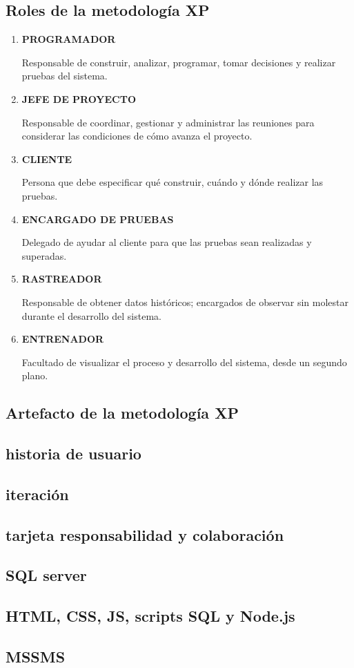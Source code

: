 \documentclass[12pt,a4paper]{article}
\newcommand{\newsubsection}[1]{\subsection{\hspace{4mm} #1}}
\newcommand{\lenguaje}{HTML, CSS, JS, scripts SQL y Node.js }
\begin{document}
\newsubsection{Roles de la metodología XP}
\begin{enumerate}
\item \textbf{PROGRAMADOR}\par
Responsable de construir, analizar, programar, tomar decisiones y realizar pruebas del sistema.
\item \textbf{JEFE DE PROYECTO}\par
Responsable de coordinar, gestionar y administrar las reuniones para considerar las condiciones de cómo avanza el proyecto.
\item \textbf{CLIENTE}\par
Persona que debe especificar qué construir, cuándo y dónde realizar las pruebas.
\item \textbf{ENCARGADO DE PRUEBAS}\par
Delegado de ayudar al cliente para que las pruebas sean realizadas y superadas.
\item \textbf{RASTREADOR}\par
Responsable de obtener datos históricos; encargados de observar sin molestar durante el desarrollo del sistema.
\item \textbf{ENTRENADOR}\par
Facultado de visualizar el proceso y desarrollo del sistema, desde un segundo plano.
\end{enumerate}

\newsubsection{Artefacto de la metodología XP}
\subsection*{historia de usuario}
\subsection*{iteración}
\subsection*{tarjeta responsabilidad y colaboración}
\subsection*{SQL server}
\subsection*{\lenguaje}
\subsection*{MSSMS }%
\end{document}
